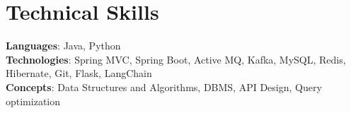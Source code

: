\section{Technical Skills}
    \begin{itemize}[leftmargin=0.15in, label={}]
	\small{\item{
		\textbf{Languages}{: Java, Python} \\
		\textbf{Technologies}{: Spring MVC, Spring Boot, Active MQ, Kafka, MySQL, Redis, Hibernate, Git, Flask, LangChain} \\
		\textbf{Concepts}{: Data Structures and Algorithms, DBMS, API Design, Query optimization}
	}}
    \end{itemize}
